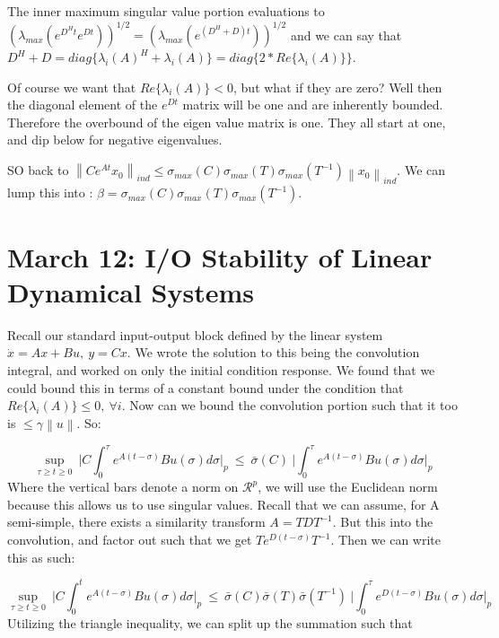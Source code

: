 \documentclass[11pt]{article}
\newcommand{\norm}[1]{\left\lVert#1\right\rVert}
\begin{document}
The inner maximum singular value portion evaluations to $(\lambda_{max} (e^{D^Ht}e^{Dt}))^{1/2} = (\lambda_{max} (e^{(D^H + D)t}))^{1/2} $ and we can say that $D^H + D = diag\{ \lambda_i(A)^H + \lambda_i(A) \} = diag\{2*Re\{ \lambda_i(A) \}\}$.

Of course we want that $Re\{ \lambda_i(A) \} < 0$, but what if they are zero? Well then the diagonal element of the $e^{Dt}$ matrix will be one and are inherently bounded. Therefore the overbound of the eigen value matrix is one. They all start at one, and dip below for negative eigenvalues. 


SO back to $\norm{Ce^{At}x_0}_{ind} \leq \sigma_{max}(C)\sigma_{max}(T)\sigma_{max}(T^{-1})\norm{x_0}_{ind}$. We can lump this into : $\beta = \sigma_{max}(C)\sigma_{max}(T)\sigma_{max}(T^{-1}) $.


\section{March 12: I/O Stability of Linear Dynamical Systems}
Recall our standard input-output block defined by the linear system $\dot{x} = Ax+Bu, \ y=Cx$. We wrote the solution to this being the convolution integral, and worked on only the initial condition response. We found that we could bound this in terms of a constant bound under the condition that $Re\{ \lambda_i(A) \} \leq 0, \ \forall i$. Now can we bound the convolution portion such that it too is $\leq \gamma \norm{u}$. So:


\begin{equation}
	\sup_{\tau \geq t \geq0} \  \bigg \rvert C \int_0^\tau e^{A(t-\sigma)}Bu(\sigma)d\sigma  \bigg \rvert_p \ \leq \ \bar{\sigma}(C) \ \bigg  \rvert \int_0^\tau e^{A(t-\sigma)}Bu(\sigma)d\sigma \bigg  \rvert_p
\end{equation}
Where the vertical bars denote a norm on $\mathcal{R}^p$, we will use the Euclidean norm because this allows us to use singular values. Recall that we can assume, for A semi-simple, there exists a similarity transform $A = TDT^{-1}$. But this into the convolution, and factor out such that we get $Te^{D(t-\sigma)}T^{-1}$. Then we can write this as such: 

\begin{equation}
	\sup_{\tau \geq t \geq0} \ \rvert C \int_0^t e^{A(t-\sigma)}Bu(\sigma)d\sigma \rvert_p \ \leq \ \bar{\sigma}(C) \bar{\sigma}(T) \bar{\sigma}(T^{-1})   \ \bigg \rvert \int_0^\tau e^{D(t-\sigma)}Bu(\sigma)d\sigma \bigg \rvert_p
\end{equation}
Utilizing the triangle inequality, we can split up the summation such that 
\end{document}
